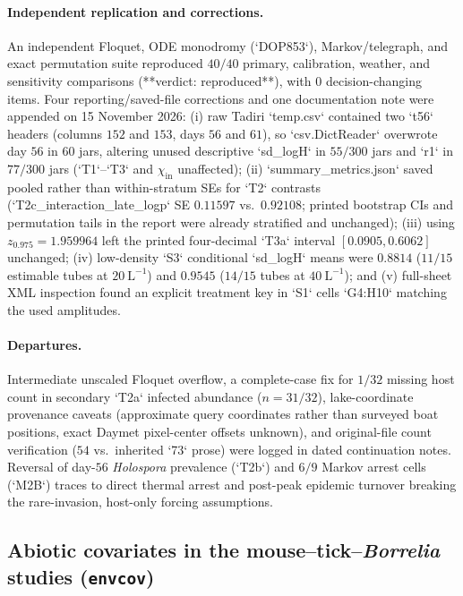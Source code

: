 \paragraph{Independent replication and corrections.}
An independent Floquet, ODE monodromy (`DOP853`), Markov/telegraph, and exact permutation suite reproduced $40/40$ primary, calibration, weather, and sensitivity comparisons (**verdict: reproduced**), with $0$ decision-changing items. Four reporting/saved-file corrections and one documentation note were appended on 15 November 2026: (i) raw Tadiri `temp.csv` contained two `t56` headers (columns $152$ and $153$, days $56$ and $61$), so `csv.DictReader` overwrote day $56$ in $60$ jars, altering unused descriptive `sd\_logH` in $55/300$ jars and `r1` in $77/300$ jars (`T1`--`T3` and $\chi_{\mathrm{in}}$ unaffected); (ii) `summary\_metrics.json` saved pooled rather than within-stratum SEs for `T2` contrasts (`T2c\_interaction\_late\_logp` SE $0.11597$ vs.\ $0.92108$; printed bootstrap CIs and permutation tails in the report were already stratified and unchanged); (iii) using $z_{0.975} = 1.959964$ left the printed four-decimal `T3a` interval $[0.0905, 0.6062]$ unchanged; (iv) low-density `S3` conditional `sd\_logH` means were $0.8814$ ($11/15$ estimable tubes at $20\ \mathrm{L}^{-1}$) and $0.9545$ ($14/15$ tubes at $40\ \mathrm{L}^{-1}$); and (v) full-sheet XML inspection found an explicit treatment key in `S1` cells `G4:H10` matching the used amplitudes.

\paragraph{Departures.}
Intermediate unscaled Floquet overflow, a complete-case fix for $1/32$ missing host count in secondary `T2a` infected abundance ($n = 31/32$), lake-coordinate provenance caveats (approximate query coordinates rather than surveyed boat positions, exact Daymet pixel-center offsets unknown), and original-file count verification ($54$ vs.\ inherited `73` prose) were logged in dated continuation notes. Reversal of day-$56$ \textit{Holospora} prevalence (`T2b`) and $6/9$ Markov arrest cells (`M2B`) traces to direct thermal arrest and post-peak epidemic turnover breaking the rare-invasion, host-only forcing assumptions.

\subsection{Abiotic covariates in the mouse--tick--\textit{Borrelia} studies (\texttt{envcov})}\label{num-esm-envcov}

